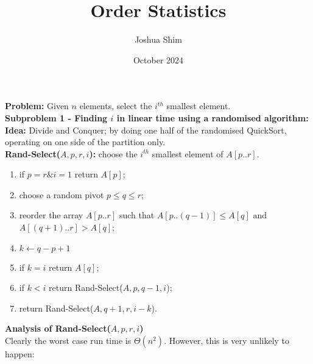 \documentclass[12pt, letterpaper]{article}
\title{Order Statistics}
\author{Joshua Shim}
\date{October 2024}
\begin{document}
\maketitle
\textbf{Problem:} Given $n$ elements, select the $i^{th}$ smallest element.\\
\textbf{Subproblem 1 - Finding $i$ in linear time using a randomised algorithm:}\\
\textbf{Idea:} Divide and Conquer; by doing one half of the randomised QuickSort, operating on one side of the partition only.\\
\textbf{Rand-Select($A,p,r,i$):} choose the $i^{th}$ smallest element of $A[p..r]$.
\begin{enumerate}
    \item if $p = r \& i = 1$ return $A[p]$; %
    \item choose a random pivot $p \leq q \leq r$;
    \item reorder the array $A[p..r]$ such that $A[p..(q - 1)] \leq A[q]$ and $A[(q+1)..r] > A[q]$;
    \item $k \leftarrow q - p + 1$
    \item if $k = i$ return $A[q]$;
    \item if $k < i$ return Rand-Select($A, p, q - 1, i$);
    \item return Rand-Select($A, q + 1, r, i - k$).
\end{enumerate}
\textbf{Analysis of Rand-Select($A, p, r, i$)}\\
Clearly the worst case run time is $\Theta(n^2)$. However, this is very unlikely to happen:
\end{document}
